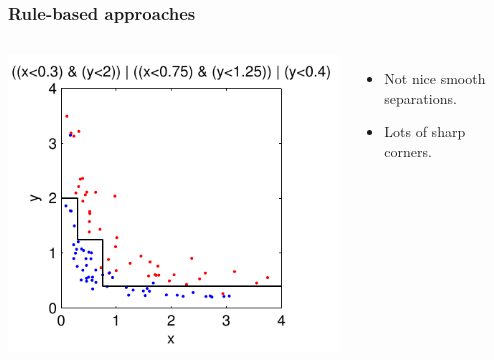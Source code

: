 \begin{frame}
\frametitle{Rule-based approaches}
\begin{columns}[c]
\includegraphics[width=\textwidth]{rule_based}
\begin{itemize}
\item Not nice smooth separations.
\item Lots of sharp corners.
\end{itemize}
\end{columns}
\end{frame}



